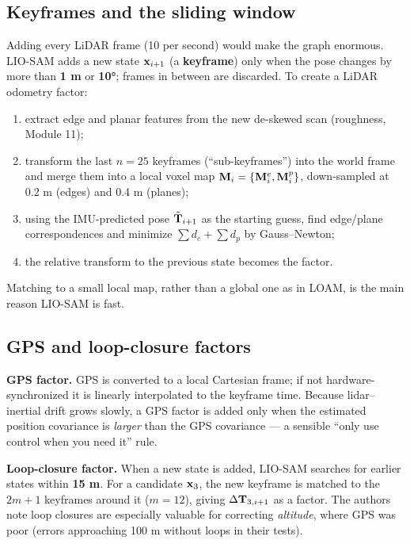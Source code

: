 \subsection{Keyframes and the sliding window}

\begin{eng}
Adding every LiDAR frame (10 per second) would make the graph enormous. LIO-SAM adds a new state $\mathbf{x}_{i+1}$ (a \textbf{keyframe}) only when the pose changes by more than \textbf{1 m} or \textbf{10°}; frames in between are discarded. To create a LiDAR odometry factor:
\begin{enumerate}
\item extract edge and planar features from the new de-skewed scan (roughness, Module 11);
\item transform the last $n=25$ keyframes (``sub-keyframes'') into the world frame and merge them into a local voxel map $\mathbf{M}_i=\{\mathbf{M}^e_i,\mathbf{M}^p_i\}$, down-sampled at 0.2 m (edges) and 0.4 m (planes);
\item using the IMU-predicted pose $\tilde{\mathbf{T}}_{i+1}$ as the starting guess, find edge/plane correspondences and minimize $\sum d_e+\sum d_p$ by Gauss--Newton;
\item the relative transform to the previous state becomes the factor.
\end{enumerate}
Matching to a small local map, rather than a global one as in LOAM, is the main reason LIO-SAM is fast.
\end{eng}

\subsection{GPS and loop-closure factors}
\begin{eng}
\textbf{GPS factor.} GPS is converted to a local Cartesian frame; if not hardware-synchronized it is linearly interpolated to the keyframe time. Because lidar--inertial drift grows slowly, a GPS factor is added only when the estimated position covariance is \emph{larger} than the GPS covariance --- a sensible ``only use control when you need it'' rule.

\textbf{Loop-closure factor.} When a new state is added, LIO-SAM searches for earlier states within \textbf{15 m}. For a candidate $\mathbf{x}_3$, the new keyframe is matched to the $2m+1$ keyframes around it ($m=12$), giving $\Delta\mathbf{T}_{3,i+1}$ as a factor. The authors note loop closures are especially valuable for correcting \emph{altitude}, where GPS was poor (errors approaching 100 m without loops in their tests).
\end{eng}

